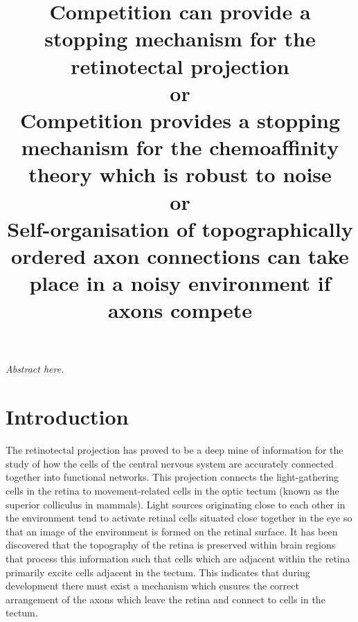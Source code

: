 \documentclass[11pt, a4paper]{article}
\title {
  Competition can provide a stopping mechanism for the retinotectal
  projection \\
  or \\
  Competition provides a stopping mechanism for the chemoaffinity
  theory which is robust to noise \\
  or \\
  Self-organisation of topographically ordered axon connections can take place
  in a noisy environment if axons compete
}
\date{} %
\author{\Authors}
\begin{document}
\setlength{\droptitle}{-1.8cm} %
\maketitle

\vspace{-1.8cm} %

\emph{Abstract here.}

\section{Introduction}

The retinotectal projection has proved to be a deep mine of information for
the study of how the cells of the central nervous system are accurately
connected together into functional networks. This projection connects the
light-gathering cells in the retina to movement-related cells in the optic
tectum (known as the superior colliculus in mammals). Light sources
originating close to each other in the environment tend to activate retinal
cells situated close together in the eye so that an image of the environment
is formed on the retinal surface. It has been discovered that the topography
of the retina is preserved within brain regions that process this information
such that cells which are adjacent within the retina primarily excite cells
adjacent in the tectum. This indicates that during development there must
exist a mechanism which ensures the correct arrangement of the axons which
leave the retina and connect to cells in the tectum.
\end{document}
